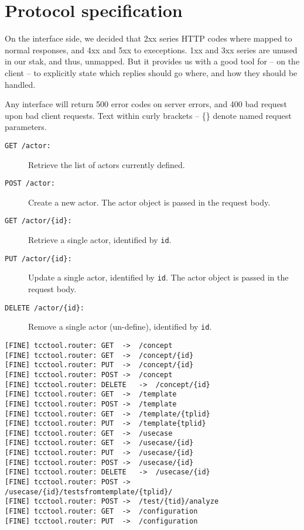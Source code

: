 \chapter{Protocol specification}
\label{appendix:protocol}
On the interface side, we decided that 2xx series HTTP codes where mapped to normal responses, and 4xx and 5xx to execeptions. 1xx and 3xx series are unused in our stak, and thus, unmapped. But it provides us with a good tool for -- on the client -- to explicitly state which replies should go where, and how they should be handled.

Any interface will return 500 error codes on server errors, and 400 bad request upon bad client requests. Text within curly brackets -- \{\} denote named request parameters.
\begin{description}
  \item[\texttt{GET /actor:}] Retrieve the list of actors currently defined.
  \item[\texttt{POST /actor:}] Create a new actor. The actor object is passed in the request body.
  \item[\texttt{GET /actor/\{id\}:}] Retrieve a single actor, identified by \texttt{id}.
  \item[\texttt{PUT /actor/\{id\}:}] Update a single actor, identified by \texttt{id}. The actor object is passed in the request body.
  \item[\texttt{DELETE /actor/\{id\}:}] Remove a single actor (un-define), identified by \texttt{id}.
\end{description}
\begin{verbatim}
[FINE] tcctool.router: GET	->	/concept
[FINE] tcctool.router: GET	->	/concept/{id}
[FINE] tcctool.router: PUT	->	/concept/{id}
[FINE] tcctool.router: POST	->	/concept
[FINE] tcctool.router: DELETE	->	/concept/{id}
[FINE] tcctool.router: GET	->	/template
[FINE] tcctool.router: POST	->	/template
[FINE] tcctool.router: GET	->	/template/{tplid}
[FINE] tcctool.router: PUT	->	/template{tplid}
[FINE] tcctool.router: GET	->	/usecase
[FINE] tcctool.router: GET	->	/usecase/{id}
[FINE] tcctool.router: PUT	->	/usecase/{id}
[FINE] tcctool.router: POST	->	/usecase/{id}
[FINE] tcctool.router: DELETE	->	/usecase/{id}
[FINE] tcctool.router: POST	->	/usecase/{id}/testsfromtemplate/{tplid}/
[FINE] tcctool.router: POST	->	/test/{tid}/analyze
[FINE] tcctool.router: GET	->	/configuration
[FINE] tcctool.router: PUT	->	/configuration
\end{verbatim}
